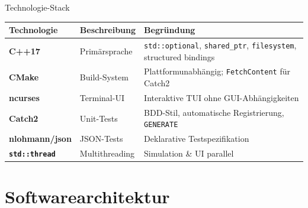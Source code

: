 \documentclass[10pt]{beamer}
\begin{document}
\begin{frame}{Technologie-Stack}
    \small
    \begin{tabular}{>{\bfseries}p{2.2cm} p{2.5cm} p{5cm}}
        \toprule
        Technologie & Beschreibung & Begründung \\
        \midrule
        C++17 & Primärsprache & \texttt{std::optional}, \texttt{shared\_ptr}, \texttt{filesystem}, structured bindings \\
        CMake & Build-System & Plattformunabhängig; \texttt{FetchContent} für Catch2 \\
        ncurses & Terminal-UI & Interaktive TUI ohne GUI-Abhängigkeiten \\
        Catch2 & Unit-Tests & BDD-Stil, automatische Registrierung, \texttt{GENERATE} \\
        nlohmann/json & JSON-Tests & Deklarative Testspezifikation \\
        \texttt{std::thread} & Multithreading & Simulation \& UI parallel \\
        \bottomrule
    \end{tabular}
\end{frame}

\section{Softwarearchitektur}
\end{document}
